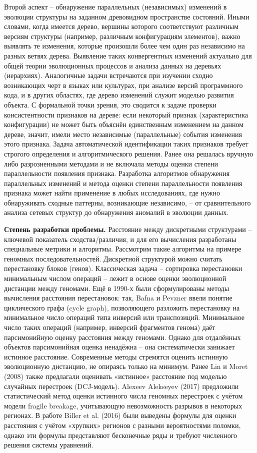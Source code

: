 Второй аспект – обнаружение параллельных (независимых) изменений в эволюции структуры на заданном древовидном пространстве состояний. Иными словами, когда имеется дерево, вершины которого соответствуют различным версиям структуры (например, различным конфигурациям элементов), важно выявлять те изменения, которые произошли более чем один раз независимо на разных ветвях дерева. Выявление таких конвергентных изменений актуально для общей теории эволюционных процессов и анализа данных на деревьях (иерархиях). Аналогичные задачи встречаются при изучении сходно возникающих черт в языках или культурах, при анализе версий программного кода, и в других областях, где дерево изменений служит моделью развития объекта. С формальной точки зрения, это сводится к задаче проверки консистентности признаков на дереве: если некоторый признак (характеристика конфигурации) не может быть объяснён единственным изменением на данном дереве, значит, имели место независимые (параллельные) события изменения этого признака. Задача автоматической идентификации таких признаков требует строгого определения и алгоритмического решения. Ранее она решалась вручную либо разрозненными методами и не включала методы оценки степени параллельности появления признака. Разработка алгоритмов обнаружения параллельных изменений и метода оценки степени параллельности появления признака может найти применение в любых исследованиях, где нужно обнаруживать сходные паттерны, возникающие независимо, – от сравнительного анализа сетевых структур до обнаружения аномалий в эволюции данных.

\newpage
\textbf{Степень разработки проблемы.}
Расстояние между дискретными структурами – ключевой показатель сходства/различия, и для его вычисления разработаны специальные метрики и алгоритмы. Рассмотрим такие алгоритмы на примере геномных последовательностей. Дискретной структурой можно считать перестановку блоков (генов). Классическая задача – сортировка перестановки минимальным числом операций – лежит в основе оценки эволюционной дистанции между геномами. Ещё в 1990-х были сформулированы методы вычисления расстояния перестановок: так, Bafna и Pevzner ввели понятие циклического графа (cycle graph), позволяющего разложить перестановку на минимальное число операций типа инверсий или транспозиций. Минимальное число таких операций (например, инверсий фрагментов генома) даёт парсимонийную оценку расстояния между геномами. Однако для отдалённых объектов парсимонийная оценка ненадёжна – она систематически занижает истинное расстояние. Современные методы стремятся оценить истинную эволюционную дистанцию, не опираясь только на минимум. Ранее Lin и Moret (2008) также предлагали оценивать «истинное» расстояние под моделью случайных перестроек (DCJ-модель). Alexeev Alekseyev (2017) предложили статистический метод оценки истинного числа геномных перестроек с учётом модели fragile breakage, учитывающую невозможность разрывов в некоторых регионах. В работе Biller et al. (2016) были выведены формулы для оценки расстояния с учётом «хрупких» регионов с разными вероятностями поломки, однако эти формулы представляют бесконечные ряды и требуют численного решения системы уравнений.

